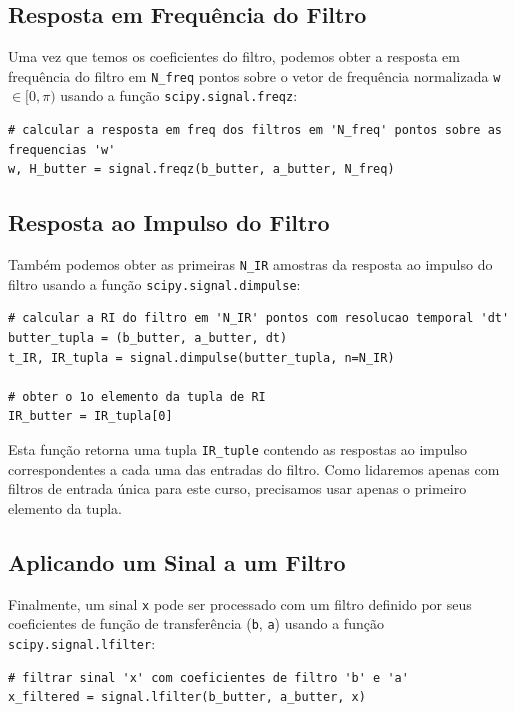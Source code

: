 \documentclass[a4paper,twoside,12pt]{article}
\begin{document}
	\subsection{Resposta em Frequência do Filtro}
	
	Uma vez que temos os coeficientes do filtro, podemos obter a resposta em frequência do filtro em {\tt N\_freq} pontos sobre o vetor de frequência normalizada {\tt w} $\in [0, \pi)$ usando a função {\tt scipy.signal.freqz}:
	
	\begin{lstlisting}[frame=single]
# calcular a resposta em freq dos filtros em 'N_freq' pontos sobre as frequencias 'w'
w, H_butter = signal.freqz(b_butter, a_butter, N_freq)
	\end{lstlisting}
	
	\subsection{Resposta ao Impulso do Filtro}
	
	Também podemos obter as primeiras {\tt N\_IR} amostras da resposta ao impulso do filtro usando a função {\tt scipy.signal.dimpulse}:
	
	\begin{lstlisting}[frame=single]
# calcular a RI do filtro em 'N_IR' pontos com resolucao temporal 'dt'
butter_tupla = (b_butter, a_butter, dt)
t_IR, IR_tupla = signal.dimpulse(butter_tupla, n=N_IR)

# obter o 1o elemento da tupla de RI
IR_butter = IR_tupla[0]
	\end{lstlisting}
	
	Esta função retorna uma tupla {\tt IR\_tuple} contendo as respostas ao impulso correspondentes a cada uma das entradas do filtro. Como lidaremos apenas com filtros de entrada única para este curso, precisamos usar apenas o primeiro elemento da tupla.
	
	\subsection{Aplicando um Sinal a um Filtro}
	
	Finalmente, um sinal {\tt x} pode ser processado com um filtro definido por seus coeficientes de função de transferência ({\tt b}, {\tt a}) usando a função {\tt scipy.signal.lfilter}:
	
	\begin{lstlisting}[frame=single]
# filtrar sinal 'x' com coeficientes de filtro 'b' e 'a'
x_filtered = signal.lfilter(b_butter, a_butter, x)
	\end{lstlisting}
	
\end{document}
